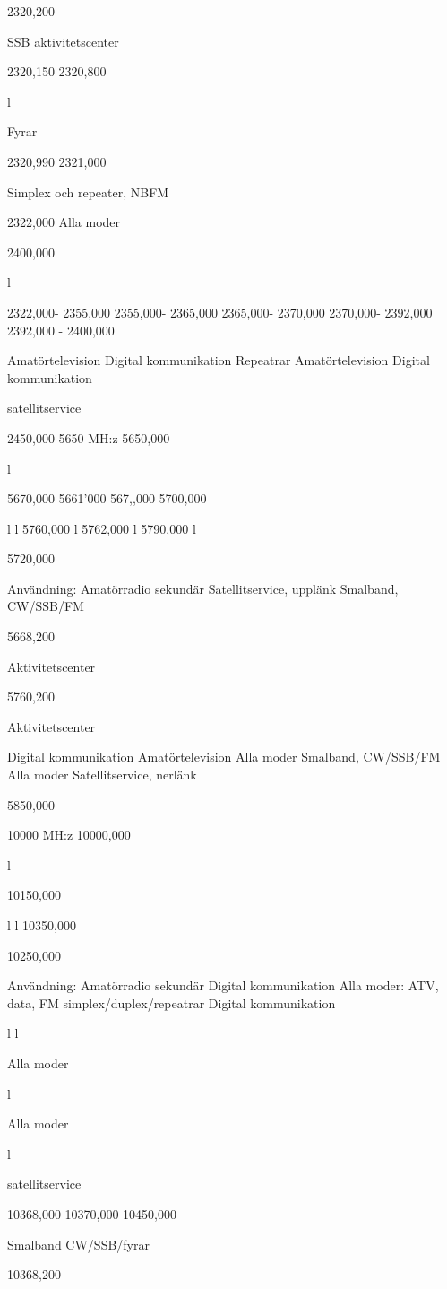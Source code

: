 \documentclass[a4paper,twoside,twocolumn,openright]{book}
\begin{document}
{{{{{{{{{{{2320,200

SSB aktivitetscenter

2320,150
2320,800

l

Fyrar

2320,990
2321,000

Simplex och repeater, NBFM

2322,000
Alla moder

2400,000

l

2322,000- 2355,000
2355,000- 2365,000
2365,000- 2370,000
2370,000- 2392,000
2392,000 - 2400,000

Amatörtelevision
Digital kommunikation
Repeatrar
Amatörtelevision
Digital kommunikation

satellitservice

2450,000
5650 MH:z
5650,000

l

5670,000
5661'000
567,,000
5700,000

l
l
5760,000
l
5762,000
l
5790,000
l

5720,000

Användning: Amatörradio sekundär
Satellitservice, upplänk
Smalband, CW/SSB/FM

5668,200

Aktivitetscenter

5760,200

Aktivitetscenter

Digital kommunikation
Amatörtelevision
Alla moder
Smalband, CW/SSB/FM
Alla moder
Satellitservice, nerlänk

5850,000

10000 MH:z
10000,000

l

10150,000

l
l
10350,000

10250,000

Användning: Amatörradio sekundär
Digital kommunikation
Alla moder: ATV, data, FM simplex/duplex/repeatrar
Digital kommunikation

l
l

Alla moder

l

Alla moder

l

satellitservice

10368,000
10370,000
10450,000

Smalband CW/SSB/fyrar

10368,200

}}}}}}}}}}}
\end{document}
